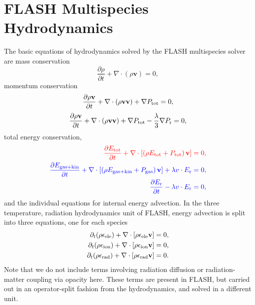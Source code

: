 \documentclass[preprint,11pt]{aastex}
\newcommand{\beq}{\begin{equation}}
\newcommand{\eeq}{\end{equation}}
\newcommand{\bea}{\begin{eqnarray}}
\newcommand{\eea}{\end{eqnarray}}
\begin{document}
\section{FLASH Multispecies Hydrodynamics}
\label{sec:hydro}
The basic equations of hydrodynamics solved by the FLASH multispecies solver are mass conservation
\beq 
\label{eq:e1}
\frac{\partial \rho}{\partial t} + \nabla \cdot (\rho \mathbf{v}) = 0, 
\eeq
momentum conservation
{\color{red}
\beq
\label{eq:e2}
\frac{\partial \rho\mathbf{v}}{\partial t} + \nabla \cdot (\rho\mathbf{v}\mathbf{v}) + \nabla P_{\rm tot} = 0,
\eeq
}
{\color{blue}
\beq
\label{eq:newmom}
\frac{\partial \rho\mathbf{v}}{\partial t} + \nabla \cdot (\rho\mathbf{v}\mathbf{v}) + \nabla P_{\rm tot} - \frac{\lambda}{3} \nabla P_{\rm r}= 0,
\eeq
}
total energy conservation,
\bea
{\color{red}
	\label{eq:e3}
	\frac{\partial E_{\rm tot}}{\partial t} + \nabla \cdot \left[ \left( \rho E_{\rm tot} + P_{\rm tot} \right) \mathbf{v} \right] = 0,
}\\
{\color{blue}
	\label{eq:e3}
	\frac{\partial E_{\rm gas+kin}}{\partial t} + \nabla \cdot \left[ \left( \rho E_{\rm gas+kin} + P_{\rm gas} \right) \mathbf{v} \right] + \lambda v \cdot E_{\rm r} = 0,
}\\
{\color{blue}
	\frac{\partial E_{\rm r}}{\partial t} - \lambda v \cdot E_{\rm r} = 0,
}
\eea
and the individual equations for internal energy advection.  In the three temperature, radiation hydrodynamics unit of FLASH, energy advection is split into three equations, one for each species
\bea 
\label{eq:e4}
\partial_t (\rho \epsilon_{\rm ele}) + \nabla \cdot [\rho \epsilon_{\rm ele} \mathbf{v}] = 0, \\
\label{eq:e5}
\partial_t (\rho \epsilon_{\rm ion}) + \nabla \cdot [\rho \epsilon_{\rm ion} \mathbf{v}] = 0, \\
\label{eq:e6}
\partial_t (\rho \epsilon_{\rm rad}) + \nabla \cdot [\rho \epsilon_{\rm rad} \mathbf{v}] = 0.
\eea
Note that we do not include terms involving radiation diffusion or radiation-matter coupling via opacity here.  These terms are present in FLASH, but carried out in an operator-split fashion from the hydrodynamics, and solved in a different unit.
\end{document}
